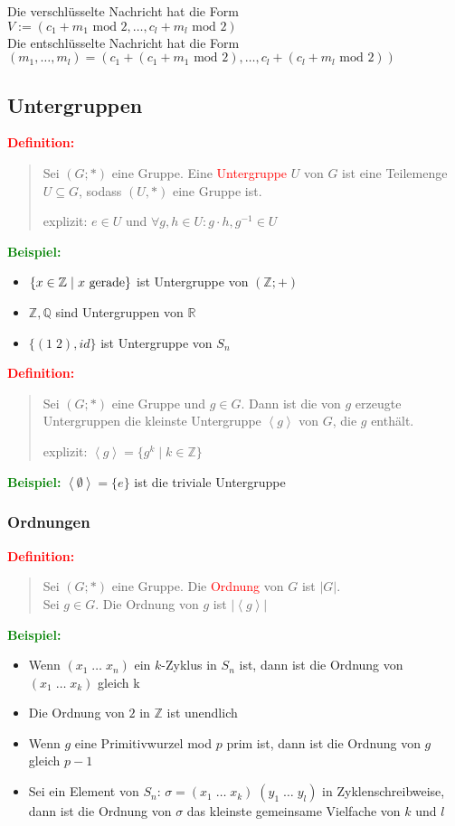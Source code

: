 \documentclass{article}
\newcommand{\smsp}{\phantom{\hspace{3px}}}
\newcommand{\red}[1]{\textcolor{red}{#1}}
\newcommand{\green}[1]{\textcolor{green}{#1}}
\newcommand{\ex}{\green{\textbf{Beispiel: }}}
\newcommand{\de}[1]{\red{\textbf{Definition: }}\begin{quote}#1\end{quote}}
\newcommand{\Z}{\mathbb{Z}}
\newcommand{\Q}{\mathbb{Q}}
\newcommand{\R}{\mathbb{R}}
\renewcommand{\st}{\smsp | \smsp}
\renewcommand{\mod}{\text{ mod }}
\newcommand{\spann}[1]{\left\langle#1\right\rangle}
\begin{document}
Die verschlüsselte Nachricht hat die Form\\
$V := (c_1 + m_1 \mod 2, \dots, c_l + m_l \mod 2)$\\
Die entschlüsselte Nachricht hat die Form \\
$(m_1, \dots, m_l) = (c_1 + (c_1 + m_1 \mod 2), \dots, c_l + (c_l + m_l \mod 2))$

\subsection{Untergruppen}

\de{
    Sei $(G; *)$ eine Gruppe. Eine \red{Untergruppe} $U$ von $G$ ist eine Teilemenge $U \subseteq G$, sodass $(U, *)$ eine Gruppe ist.

    explizit: $e \in U$ und $\forall g,h \in U: g \cdot h, g^{-1} \in U$
}

\ex \begin{itemize}
    \item $\{x \in \Z \st x \text{ gerade}\}$ ist Untergruppe von $(\Z; +)$
    \item $\Z, \Q$ sind Untergruppen von $\R$
    \item $\{(1 \; 2), id\}$ ist Untergruppe von $S_n$
\end{itemize}

\de{
    Sei $(G; *)$ eine Gruppe und $g \in G$. Dann ist die von $g$ erzeugte Untergruppen die kleinste Untergruppe $\spann{g}$ von $G$, die $g$ enthält.

    explizit: $\spann{g} = \{g^k \mid k \in \Z\}$
}

\ex $\spann{\emptyset} = \{e\}$ ist die triviale Untergruppe

\subsubsection{Ordnungen}

\de{
    Sei $(G; *)$ eine Gruppe. Die \red{Ordnung} von $G$ ist $|G|$.\\
    Sei $g \in G$. Die Ordnung von $g$ ist $|\spann{g}|$
}

\ex \begin{itemize}
    \item Wenn $(x_1 \; \dots \; x_n)$ ein $k$-Zyklus in $S_n$ ist, dann ist die Ordnung von $(x_1 \; \dots \; x_k)$ gleich k
    \item Die Ordnung von $2$ in $\Z$ ist unendlich
    \item Wenn $g$ eine Primitivwurzel mod $p$ prim ist, dann ist die Ordnung von $g$ gleich $p-1$
    \item Sei ein Element von $S_n$: $\sigma = (x_1 \; \dots \; x_k) \; (y_1 \; \dots \; y_l)$ in Zyklenschreibweise, dann ist die Ordnung von $\sigma$ das kleinste gemeinsame Vielfache von $k$ und $l$
\end{itemize}
\end{document}
